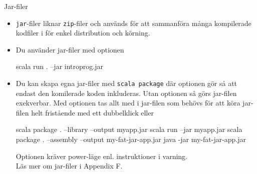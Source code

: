 \begin{Slide}{Jar-filer}
\begin{itemize}\SlideFontTiny
\item 
\texttt{jar}-filer liknar \texttt{zip}-filer och används för att sammanföra många kompilerade kodfiler i  för enkel distribution och körning.
\item Du använder jar-filer med optionen 
\begin{REPLsmall}
scala run . --jar introprog.jar
\end{REPLsmall}
\item Du kan skapa egna jar-filer med \texttt{scala package} där optionen  gör så att endast den komilerade koden inkluderas. Utan optionen  så görs jar-filen exekverbar. Med optionen  tas allt med i jar-filen som behövs för att köra jar-filen helt fristående med ett dubbelklick eller 
\begin{REPLsmall}
scala package . --library --output myapp.jar
scala run --jar myapp.jar
scala package . --assembly --output my-fat-jar-app.jar
java -jar my-fat-jar-app.jar
\end{REPLsmall}
Optionen  kräver power-läge enl. instruktioner i varning.\\
Läs mer om jar-filer i Appendix F.
\end{itemize}





\end{Slide}

